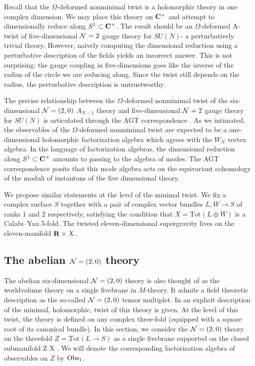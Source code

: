 Recall that the $\Omega$-deformed nonminimal twist is a holomorphic theory in one complex dimension. We may place this theory on $\mathbf{C}^{\times}$ and attempt to dimensionally reduce along $S^{1}\subset \mathbf{C}^{\times}$. The result should be an $\Omega$-deformed A-twist of five-dimensional $\mathcal N =2$ gauge theory for $SU(N)$- a perturbatively trivial theory. However, naively computing the dimensional reduction using a perturbative description of the fields yields an incorrect answer. This is not surprising: the gauge coupling in five-dimensions goes like the inverse of the radius of the circle we are reducing along. Since the twist still depends on the radius, the perturbative description is untrustworthy.

The precise relationship between the $\Omega$-deformed nonminimal twist of the six-dimensional $\mathcal N=(2,0)$ $A_{N-1}$ theory and five-dimensional $\mathcal N=2$ gauge theory for $SU(N)$ is articulated through the AGT correspondence \cite{AGT}. As we intimated, the observables of the $\Omega$-deformed nonminimal twist are expected to be a one-dimensional holomorphic factorization algebra which agrees with the $W_{N}$ vertex algebra. In the language of factorization algebras, the dimensional reduction along $S^{1}\subset \mathbf{C}^{\times}$ amounts to passing to the algebra of modes. The AGT correspondence posits that this mode algebra acts on the equivariant cohomology of the moduli of instantons of the five dimensional theory.

We propose similar statements at the level of the minimal twist. 
We fix a complex surface $S$ together with a pair of complex vector bundles $L,W \to S$ of ranks $1$ and $2$ respectively, satisfying the condition that $X = \text{Tot} (L \oplus W)$ is a Calabi--Yau 5-fold.
The twisted eleven-dimensional supergravity lives on the eleven-manifold $\mathbf{R} \times X$. 

\subsection*{The abelian $\mathcal N=(2,0)$ theory}

The abelian six-dimensional $\mathcal N=(2,0)$ theory is also thought of as the worldvolume theory on a single fivebrane in $M$-theory. 
It admits a field theoretic description as the so-called $\mathcal N=(2,0)$ tensor multiplet. 
In \cite{SWtensor} an explicit description of the minimal, holomorphic, twist of this theory is given.
At the level of this twist, the theory is defined on any complex three-fold (equipped with a square root of its canonical bundle). 
In this section, we consider the $\mathcal N=(2,0)$ theory on the threefold $Z = \text{Tot}(L \to S)$ as a single fivebrane supported on the closed submanifold
\beqn
Z \hookrightarrow \R \times X .
\eeqn
We will denote the corresponding factorization algebra of observables on $Z$ by $\operatorname{Obs}_1$.


